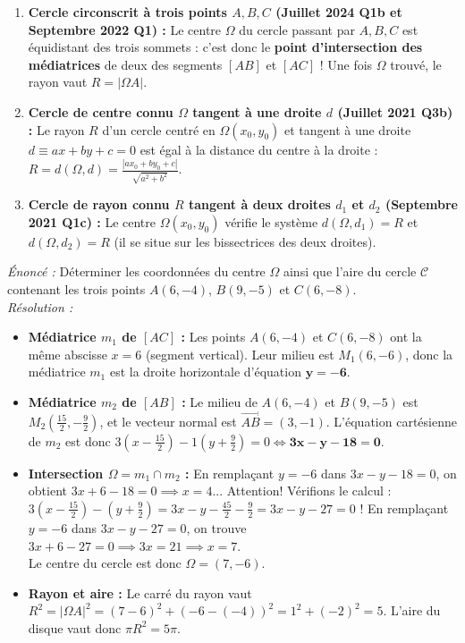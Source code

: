 \begin{astuce}
\begin{enumerate}
    \item \textbf{Cercle circonscrit à trois points $A, B, C$ (Juillet 2024 Q1b et Septembre 2022 Q1) :} Le centre $\Omega$ du cercle passant par $A, B, C$ est équidistant des trois sommets : c'est donc le \textbf{point d'intersection des médiatrices} de deux des segments $[AB]$ et $[AC]$ ! Une fois $\Omega$ trouvé, le rayon vaut $R = |\Omega A|$.
    \item \textbf{Cercle de centre connu $\Omega$ tangent à une droite $d$ (Juillet 2021 Q3b) :} Le rayon $R$ d'un cercle centré en $\Omega(x_0, y_0)$ et tangent à une droite $d \equiv ax + by + c = 0$ est égal à la distance du centre à la droite : $R = d(\Omega, d) = \frac{|ax_0+by_0+c|}{\sqrt{a^2+b^2}}$.
    \item \textbf{Cercle de rayon connu $R$ tangent à deux droites $d_1$ et $d_2$ (Septembre 2021 Q1c) :} Le centre $\Omega(x_0, y_0)$ vérifie le système $d(\Omega, d_1) = R$ et $d(\Omega, d_2) = R$ (il se situe sur les bissectrices des deux droites).
\end{enumerate}
\end{astuce}

\begin{exemple}
\emph{Énoncé :} Déterminer les coordonnées du centre $\Omega$ ainsi que l'aire du cercle $\mathcal{C}$ contenant les trois points $A(6, -4)$, $B(9, -5)$ et $C(6, -8)$.\\
\emph{Résolution :}
\begin{itemize}
    \item \textbf{Médiatrice $m_1$ de $[AC]$ :} Les points $A(6, -4)$ et $C(6, -8)$ ont la même abscisse $x = 6$ (segment vertical). Leur milieu est $M_1(6, -6)$, donc la médiatrice $m_1$ est la droite horizontale d'équation $\mathbf{y = -6}$.
    \item \textbf{Médiatrice $m_2$ de $[AB]$ :} Le milieu de $A(6, -4)$ et $B(9, -5)$ est $M_2\left(\frac{15}{2}, -\frac{9}{2}\right)$, et le vecteur normal est $\overrightarrow{AB} = (3, -1)$. L'équation cartésienne de $m_2$ est donc $3\left(x - \frac{15}{2}\right) - 1\left(y + \frac{9}{2}\right) = 0 \iff \mathbf{3x - y - 18 = 0}$.
    \item \textbf{Intersection $\Omega = m_1 \cap m_2$ :} En remplaçant $y = -6$ dans $3x - y - 18 = 0$, on obtient $3x + 6 - 18 = 0 \implies x = 4$... Attention! Vérifions le calcul : $3(x - \frac{15}{2}) - (y + \frac{9}{2}) = 3x - y - \frac{45}{2} - \frac{9}{2} = 3x - y - 27 = 0$ ! En remplaçant $y = -6$ dans $3x - y - 27 = 0$, on trouve $3x + 6 - 27 = 0 \implies 3x = 21 \implies x = 7$.\\
    Le centre du cercle est donc $\Omega = \boxed{(7, -6)}$.
    \item \textbf{Rayon et aire :} Le carré du rayon vaut $R^2 = |\Omega A|^2 = (7-6)^2 + (-6 - (-4))^2 = 1^2 + (-2)^2 = 5$. L'aire du disque vaut donc $\pi R^2 = \boxed{5\pi}$.
\end{itemize}
\end{exemple}

